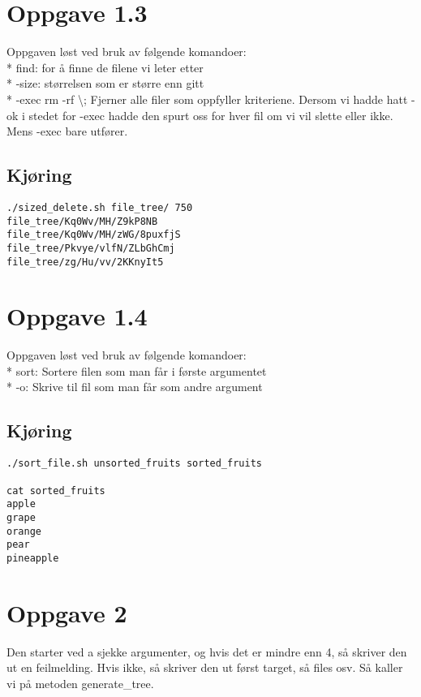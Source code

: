\documentclass{article}
\begin{document}
\section*{Oppgave 1.3}
Oppgaven løst ved bruk av følgende komandoer: 
\\* find: for å finne de filene vi leter etter
\\* -size: størrelsen som er større enn gitt
\\* -exec rm -rf {}  \textbackslash ; Fjerner alle filer som 
oppfyller kriteriene. Dersom vi hadde hatt -ok i stedet for -exec
hadde den spurt oss for hver fil om vi vil slette eller ikke. Mens 
-exec bare utfører.  

\subsection*{Kjøring}
\begin{Verbatim}
./sized_delete.sh file_tree/ 750
file_tree/Kq0Wv/MH/Z9kP8NB
file_tree/Kq0Wv/MH/zWG/8puxfjS
file_tree/Pkvye/vlfN/ZLbGhCmj
file_tree/zg/Hu/vv/2KKnyIt5

\end{Verbatim}


\section*{Oppgave 1.4}
Oppgaven løst ved bruk av følgende komandoer: 
\\* sort: Sortere filen som man får i første argumentet
\\* -o: Skrive til fil som man får som andre argument


\subsection*{Kjøring}
\begin{Verbatim}
./sort_file.sh unsorted_fruits sorted_fruits

cat sorted_fruits
apple
grape
orange
pear
pineapple

\end{Verbatim}


\section{Oppgave 2}

Den starter ved a sjekke argumenter, og hvis det er mindre enn 4, så 
skriver den ut en feilmelding. Hvis ikke, så skriver den ut først 
target, så files osv. Så kaller vi på metoden generate\_tree.
\end{document}
